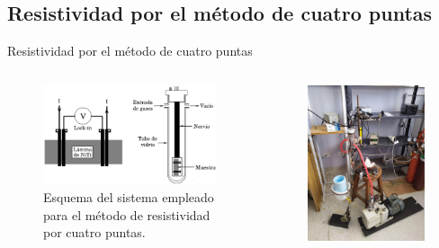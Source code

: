 \documentclass[11pt]{beamer}
\begin{document}
	\subsection{Resistividad por el método de cuatro puntas}
		\begin{frame}{Resistividad por el método de cuatro puntas}
			\begin{columns}
				\begin{column}{.49\textwidth}
					\begin{figure}[H]
						\centering
						\includegraphics[scale=0.3]{img/resistividad.eps}
						\caption*{Esquema del sistema empleado para el método de 								 resistividad por cuatro puntas.}
					\end{figure}
				\end{column}
				\begin{column}{.49\textwidth}
					\begin{figure}[H]
						\centering
						\includegraphics[scale=0.1]{img/resistividad.jpg}

\end{figure}
\end{column}
\end{columns}
\end{frame}
\end{document}
